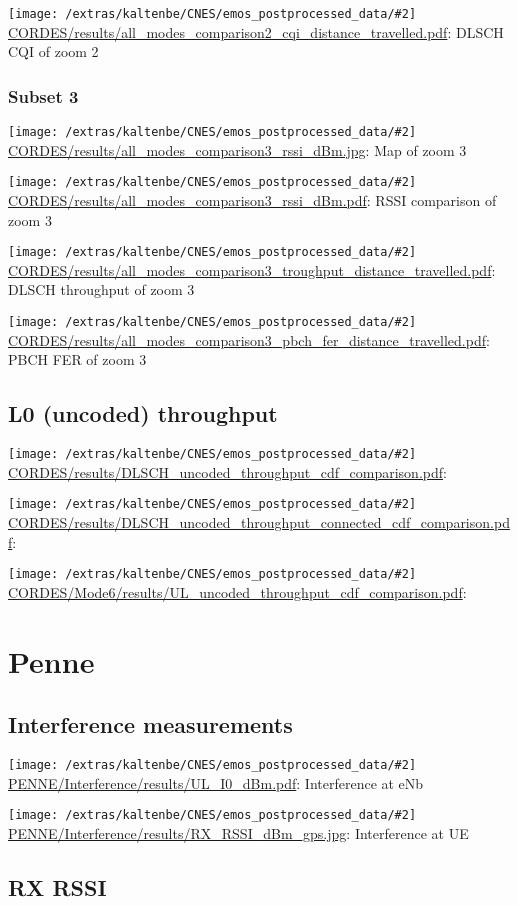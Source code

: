 \documentclass[a4paper,10pt]{article}
\newcommand{\printfile}[2][]{
 \begin{minipage}{8cm}
  \centering
  \texttt{[image: /extras/kaltenbe/CNES/emos\_postprocessed\_data/\#2]}
  \url{#2}: #1

 \end{minipage}
}
\begin{document}
\printfile[DLSCH CQI of zoom 2]{CORDES/results/all_modes_comparison2_cqi_distance_travelled.pdf}

\subsubsection*{Subset 3}

\printfile[Map of zoom 3]{CORDES/results/all_modes_comparison3_rssi_dBm.jpg}
\printfile[RSSI comparison of zoom 3]{CORDES/results/all_modes_comparison3_rssi_dBm.pdf}

\printfile[DLSCH throughput of zoom 3]{CORDES/results/all_modes_comparison3_troughput_distance_travelled.pdf}
\printfile[PBCH FER of zoom 3]{CORDES/results/all_modes_comparison3_pbch_fer_distance_travelled.pdf}

\subsection{L0 (uncoded) throughput}

\printfile{CORDES/results/DLSCH_uncoded_throughput_cdf_comparison.pdf}
\printfile{CORDES/results/DLSCH_uncoded_throughput_connected_cdf_comparison.pdf}

\printfile{CORDES/Mode6/results/UL_uncoded_throughput_cdf_comparison.pdf}

\section{Penne}
\label{sec:penne}

\subsection{Interference measurements}

\printfile[Interference at eNb]{PENNE/Interference/results/UL_I0_dBm.pdf}
\printfile[Interference at UE]{PENNE/Interference/results/RX_RSSI_dBm_gps.jpg}


\subsection{RX RSSI}


% 
\end{document}
